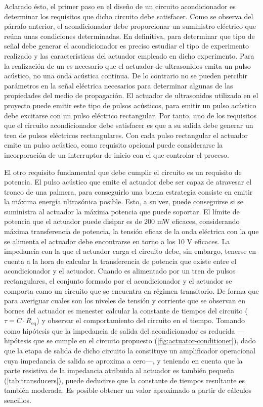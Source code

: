 Aclarado ésto, el primer paso en el diseño de un circuito acondicionador es
determinar los requisitos que dicho circuito debe satisfacer. Como se
observa del párrafo anterior, el acondicionador debe proporcionar un
suministro eléctrico que reúna unas condiciones determinadas. En
definitiva, para determinar que tipo de señal debe generar el
acondicionador es preciso estudiar el tipo de experimento realizado y las
características del actuador empleado en dicho experimento. Para la
realización de un  es necesario que el actuador de ultrasonidos
emita un pulso acústico, no una onda acústica continua. De lo contrario no
se pueden percibir parámetros en la señal eléctrica necesarios para
determinar algunas de las propiedades del medio de propagación. El actuador
de ultrasonidos utilizado en el proyecto puede emitir este tipo de pulsos
acústicos, para emitir un pulso acústico debe excitarse con un pulso
eléctrico rectangular. Por tanto, uno de los requisitos que el circuito
acondicionador debe satisfacer es que a su salida debe generar un tren de
pulsos eléctricos rectangulares. Con cada pulso rectangular el actuador
emite un pulso acústico, como requisito opcional puede considerarse la
incorporación de un interruptor de inicio con el que controlar el proceso.

El otro requisito fundamental que debe cumplir el circuito es un requisito
de potencia. El pulso acústico que emite el actuador debe ser capaz de
atravesar el tronco de una palmera, para conseguirlo una buena estrategia
consiste en emitir la máxima energía ultrasónica posible. Esto, a su vez,
puede conseguirse si se suministra al actuador la máxima potencia que puede
soportar. El límite de potencia que el actuador puede disipar es de 200 mW
eficaces, considerando máxima transferencia de potencia, la tensión eficaz
de la onda eléctrica con la que se alimenta el actuador debe encontrarse en
torno a los 10 V eficaces. La impedancia con la que el actuador carga el
circuito debe, sin embargo, tenerse en cuenta a la hora de calcular la
transferencia de potencia que existe entre el acondicionador y el actuador.
Cuando es alimentado por un tren de pulsos rectangulares, el conjunto
formado por el acondicionador y el actuador se comporta como un circuito
 que se encuentra en régimen transitorio. De forma que para
averiguar cuales son los niveles de tensión y corriente que se observan en
bornes del actuador es menester calcular la constante de tiempos del
circuito ($\tau = C\cdot R_\text{eq}$) y observar el comportamiento del
circuito en el tiempo. Tomando como hipótesis que la impedancia de salida
del acondicionador es reducida ---hipótesis que se cumple en el circuito
propuesto (\cref{fig:actuator-conditioner}), dado que la etapa de salida de
dicho circuito la constituye un amplificador operacional cuya impedancia de
salida se aproxima a cero---, y teniendo en cuenta que la parte resistiva
de la impedancia atribuida al actuador es también pequeña
(\cref{tab:transducers}), puede deducirse que la constante de tiempos
resultante es también moderada. Es posible obtener un valor aproximado a
partir de cálculos sencillos.

